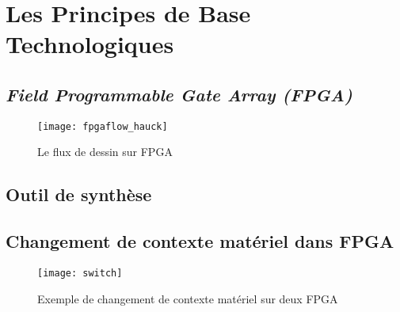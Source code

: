 \chapter{Les Principes de Base Technologiques}
\section{\emph{Field Programmable Gate Array (FPGA)}}

\blindtext

\begin{figure}[h]
	\label{fig:fpgaflow}
	\centering
	\texttt{[image: fpgaflow\_hauck]}
	\caption{Le flux de dessin sur FPGA}
	\vspace{-2mm}
\end{figure}

\section{Outil de synthèse}

\Blindtext

\section{Changement de contexte matériel dans FPGA}

\Blindtext

\begin{figure}[h]
	\label{fig:switch}
	\centering
	\texttt{[image: switch]}
	\caption{Exemple de changement de contexte matériel sur deux FPGA}
	\vspace{-2mm}
\end{figure}
